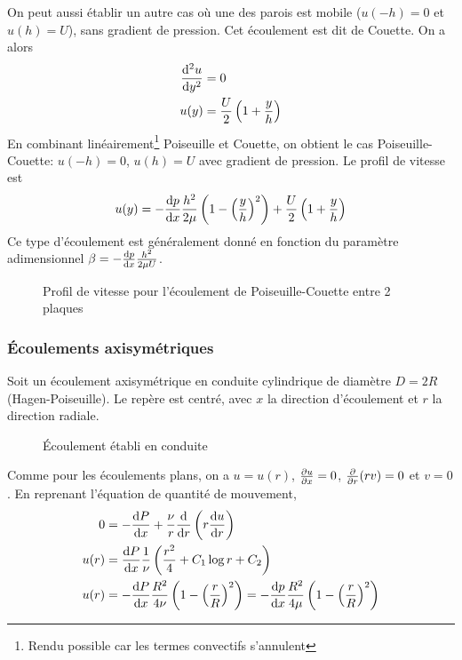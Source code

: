         On peut aussi établir un autre cas où une des parois est mobile ($u(-h) = 0$ et $u(h) = U$), sans gradient de pression. Cet écoulement est dit de Couette. On a alors
        \begin{equation}
          \begin{aligned}
            \dv[2]{u}{y} &= 0\\
            u(y) &= \frac{U}{2} \left(1 + \frac{y}{h} \right)
          \end{aligned}
        \end{equation}
        En combinant linéairement\footnote{Rendu possible car les termes convectifs s'annulent} Poiseuille et Couette, on obtient le cas Poiseuille-Couette: $u(-h)=0$, $u(h)=U$ avec gradient de pression. Le profil de vitesse est
        \begin{equation}
          u(y) = -\dv{p}{x} \frac{h^2}{2\mu} \left(1-\left(\frac{y}{h}\right)^2\right) + \frac{U}{2}\left(1+\frac{y}{h}\right)
        \end{equation}
        Ce type d'écoulement est généralement donné en fonction du paramètre adimensionnel $\beta = -\dv{p}{x} \frac{h^2}{2\mu U}$.
        \begin{figure}[h]
          \centering
          
          \caption{Profil de vitesse pour l'écoulement de Poiseuille-Couette entre 2 plaques}
        \end{figure}

      \subsubsection{Écoulements axisymétriques}
        Soit un écoulement axisymétrique en conduite cylindrique de diamètre $D=2R$ (Hagen-Poiseuille).  Le repère est centré, avec $x$ la direction d'écoulement et $r$ la direction radiale.
        \begin{figure}[!h]
          \centering
          
          \caption{Écoulement établi en conduite}
          \label{fig:Hagen}
        \end{figure}
        Comme pour les écoulements plans, on a $u = u(r)$, $\pdv{u}{x} = 0$, $\pdv{r}(rv) = 0$ et $v = 0$. En reprenant l'équation de quantité de mouvement,
        \begin{equation}
          \begin{aligned}
            0 &= -\dv{P}{x} + \frac{\nu}{r} \dv{r}\left(r\dv{u}{r}\right)\\
            u(r) &= \dv{P}{x} \frac{1}{\nu} \left(\frac{r^2}{4} + C_1 \log r + C_2 \right)\\
            u(r) &= - \dv{P}{x} \frac{R^2}{4\nu} \left(1 - \left(\frac{r}{R}\right)^2\right) = - \dv{p}{x} \frac{R^2}{4\mu} \left(1 - \left(\frac{r}{R}\right)^2\right)
          \end{aligned}
        \end{equation}

